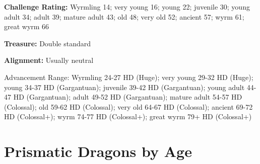 \documentclass{article}
\begin{document}
\textbf{Challenge Rating:} Wyrmling 14; very young 16; young 22; juvenile 30; young 
adult 34; adult 39; mature adult 43; old 48; very old 52; ancient 57; wyrm 61; 
great wyrm 66 

\textbf{Treasure:} Double standard 

\textbf{Alignment:} Usually neutral 

Advancement Range: Wyrmling 24-27 HD (Huge); very young 29-32 HD (Huge); young 
34-37 HD (Gargantuan); juvenile 39-42 HD (Gargantuan); young adult 44-47 HD (Gargantuan); 
adult 49-52 HD (Gargantuan); mature adult 54-57 HD (Colossal); old 59-62 HD (Colossal); 
very old 64-67 HD (Colossal); ancient 69-72 HD (Colossal+); wyrm 74-77 HD (Colossal+); 
great wyrm 79+ HD (Colossal+) 

\vspace{12pt}
\section*{\textbf{Prismatic Dragons by Age }}
\end{document}
